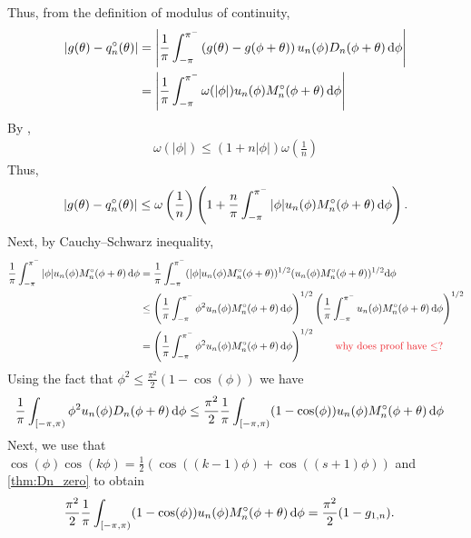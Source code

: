 \iffalse
    Thus, from the definition of modulus of continuity,
    \begin{align*}
        |g(\theta) - q_n^\circ(\theta)|
        &= \left| \frac{1}{\pi} \int_{-\pi}^{\pi^-} \left( g(\theta) - g(\phi+\theta) \right)u_n(\phi) D_n(\phi+\theta) \,\textup{d}\phi \right|
        \\&= \left| \frac{1}{\pi} \int_{-\pi}^{\pi^-} \omega(|\phi|) u_n(\phi) M_n^\circ(\phi+\theta) \,\textup{d}\phi \right|
    \end{align*}
    By , 
    \begin{align*}
        \omega(|\phi|) \leq \left( 1 + n |\phi| \right) \omega \left( \frac{1}{n} \right)
    \end{align*}
    Thus,
    \begin{align*}
        |g(\theta) - q_n^\circ(\theta)|
        \leq \omega \left( \frac{1}{n} \right) \left( 1 + \frac{n}{\pi} \int_{-\pi}^{\pi^-} |\phi| u_n(\phi) M_n^\circ(\phi+\theta) \,\textup{d}\phi \right).
    \end{align*}
    Next, by Cauchy--Schwarz inequality,
    \begin{align*}
        \frac{1}{\pi} \int_{-\pi}^{\pi^-} |\phi| u_n(\phi) M_n^\circ(\phi+\theta) \,\d\phi 
        &=\frac{1}{\pi} \int_{-\pi}^{\pi^-} (|\phi| u_n(\phi)M_n^\circ(\phi+\theta))^{1/2} (u_n(\phi)M_n^\circ(\phi+\theta))^{1/2}  \d\phi 
        \\&\leq \left( \frac{1}{\pi} \int_{-\pi}^{\pi^-} \phi^2 u_n(\phi) M_n^\circ(\phi+\theta) \,\d\phi \right)^{1/2} 
        \left( \frac{1}{\pi} \int_{-\pi}^{\pi^-} u_n(\phi) M_n^\circ(\phi+\theta) \,\d\phi \right)^{1/2}
        \\&=\left( \frac{1}{\pi} \int_{-\pi}^{\pi^-} \phi^2 u_n(\phi) M_n^\circ(\phi+\theta) \,\d\phi \right)^{1/2} 
        \tag*{\note{why does proof have $\leq$?}}
    \end{align*}
    Using the fact that  \( \phi^2 \leq \frac{\pi^2}{2} (1 -\cos(\phi)) \) we have 
    \begin{align*}
        \frac{1}{\pi}\int_{[-\pi,\pi)} \phi^2 u_n(\phi) D_n(\phi+\theta) \,\textup{d}\phi
        &\leq \frac{\pi^2}{2} \frac{1}{\pi}\int_{[-\pi,\pi)} (1-\cos(\phi)) u_n(\phi) M_n^\circ(\phi+\theta) \,\textup{d}\phi
    \end{align*}
    Next, we use that \( \cos(\phi) \cos(k\phi) = \frac{1}{2}( \cos((k-1)\phi) + \cos((s+1)\phi)) \) and \cref{thm:Dn_zero} to obtain
    \begin{align*} 
        \frac{\pi^2}{2} \frac{1}{\pi}\int_{[-\pi,\pi)} (1-\cos(\phi)) u_n(\phi) M_n^\circ(\phi+\theta) \,\textup{d}\phi
        &= \frac{\pi^2}{2} (1 - g_{1,n}).
    \end{align*}  
    
